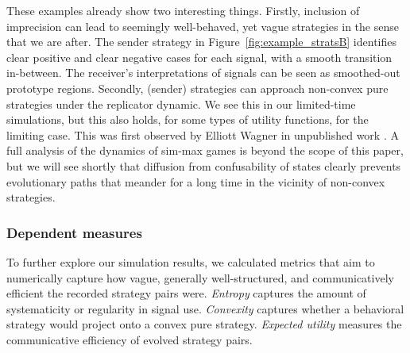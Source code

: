 \documentclass[fleqn,reqno,10pt]{article}
\begin{document}
These examples already show two interesting things. Firstly, inclusion
of imprecision can lead to seemingly well-behaved, yet vague
strategies in the sense that we are after. The sender strategy in
Figure~\ref{fig:example_stratsB} identifies clear positive and clear
negative cases for each signal, with a smooth transition
in-between. The receiver's interpretations of signals can be seen as
smoothed-out prototype regions. Secondly, (sender) strategies can
approach non-convex pure strategies under the replicator dynamic. We
see this in our limited-time simulations, but this also holds, for
some types of utility functions, for the limiting case. This was first
observed by Elliott Wagner in unpublished work
\citep[c.f.][]{OConnor2013:Evolving-Percep}. A full analysis of the
dynamics of sim-max games is beyond the scope of this paper, but we
will see shortly that diffusion from confusability of states clearly
prevents evolutionary paths that meander for a long time in the
vicinity of non-convex strategies.



\subsubsection{Dependent measures}
 
To further explore our simulation results, we calculated
metrics that aim to numerically capture how vague, generally
well-structured, and communicatively efficient the recorded
strategy pairs were. \emph{Entropy} captures the amount of
systematicity or regularity in signal use. \emph{Convexity} captures
whether a behavioral strategy would project onto a convex pure
strategy. \emph{Expected utility} measures the communicative
efficiency of evolved strategy pairs.
\end{document}
